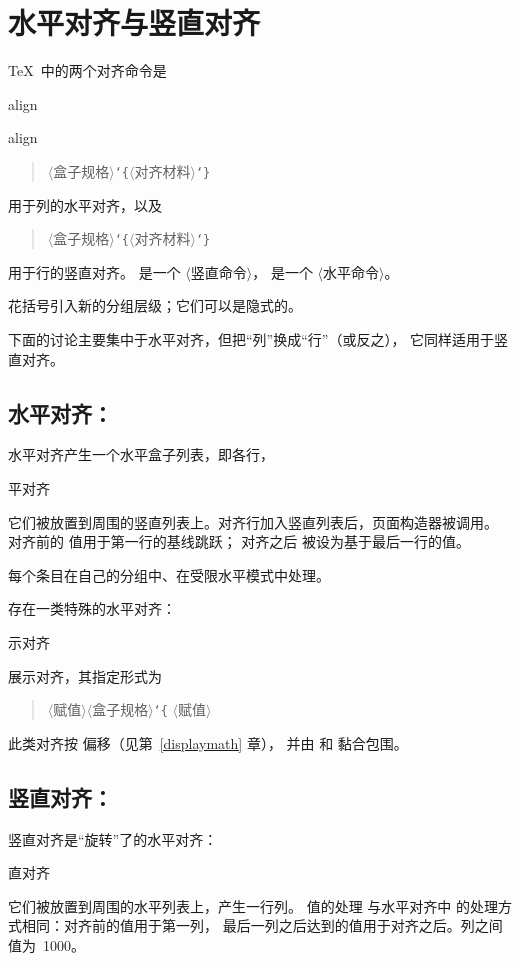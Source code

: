 \documentclass[a4paper]{rapport3}
\makeatletter
\def\lb{{\tt\char`\{}}\def\rb{{\tt\char`\}}}
\def\gr#1{$\langle$#1$\rangle$}\def\key#1{{\tt#1}}
\newenvironment{disp}{\begin{quotation}}{\end{quotation}}
\def\term#1\par{\index{#1}}
\def\cstoidx#1\par{\index{#1@\cs{#1}}}
\makeatother
\begin{document}
\section{水平对齐与竖直对齐}

\TeX\ 中的两个对齐命令是
\cstoidx halign\par\cstoidx valign\par
\begin{disp}\gr{盒子规格}\lb\gr{对齐材料}\rb
\end{disp}用于列的水平对齐，以及
\begin{disp}\gr{盒子规格}\lb\gr{对齐材料}\rb
\end{disp}用于行的竖直对齐。
 是一个 \gr{竖直命令}， 是一个 \gr{水平命令}。

花括号引入新的分组层级；它们可以是隐式的。

下面的讨论主要集中于水平对齐，但把“列”换成“行”（或反之），
它同样适用于竖直对齐。

\subsection{水平对齐：}

水平对齐产生一个水平盒子列表，即各行，
\term 水平对齐\par
它们被放置到周围的竖直列表上。对齐行加入竖直列表后，页面构造器被调用。
对齐前的  值用于第一行的基线跳跃；
对齐之后  被设为基于最后一行的值。

每个条目在自己的分组中、在受限水平模式中处理。

存在一类特殊的水平对齐：
\term 展示对齐\par
展示对齐，其指定形式为
\begin{disp}\n{\$\$}\gr{赋值}\gr{盒子规格}\lb\n{...}\rb
     \gr{赋值}\n{\$\$}\end{disp}
此类对齐按  偏移（见第~\ref{displaymath} 章），
并由  和  黏合包围。

\subsection{竖直对齐：}

竖直对齐是“旋转”了的水平对齐：
\term 竖直对齐\par
它们被放置到周围的水平列表上，产生一行列。 值的处理
与水平对齐中  的处理方式相同：对齐前的值用于第一列，
最后一列之后达到的值用于对齐之后。列之间  值为~1000。
\end{document}
